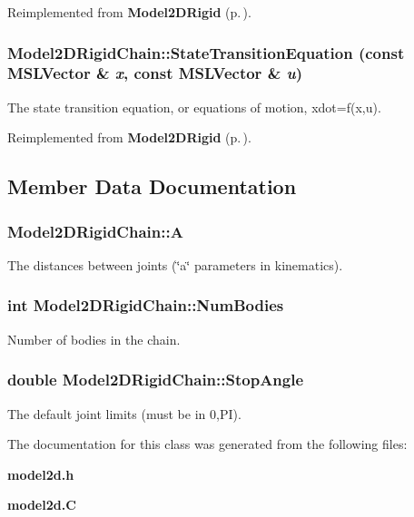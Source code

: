 Reimplemented from {\bf Model2DRigid} {\rm (p.\,\pageref{classModel2DRigid_a7})}.
\subsubsection{ Model2DRigid\-Chain::State\-Transition\-Equation (const {\bf MSLVector} \& {\em x}, const {\bf MSLVector} \& {\em u})\hspace{0.3cm}{\tt  [virtual]}}\label{classModel2DRigidChain_a3}


The state transition equation, or equations of motion, xdot=f(x,u).



Reimplemented from {\bf Model2DRigid} {\rm (p.\,\pageref{classModel2DRigid_a3})}.

\subsection{Member Data Documentation}
\subsubsection{ Model2DRigid\-Chain::A}\label{classModel2DRigidChain_m1}


The distances between joints (\char`\"{}a\char`\"{} parameters in kinematics).

\subsubsection{\setlength{\rightskip}{0pt plus 5cm}int Model2DRigid\-Chain::Num\-Bodies}\label{classModel2DRigidChain_m0}


Number of bodies in the chain.

\subsubsection{\setlength{\rightskip}{0pt plus 5cm}double Model2DRigid\-Chain::Stop\-Angle}\label{classModel2DRigidChain_m2}


The default joint limits (must be in 0,PI).



The documentation for this class was generated from the following files:\begin{CompactItemize}
\item 
{\bf model2d.h}\item 
{\bf model2d.C}\end{CompactItemize}
